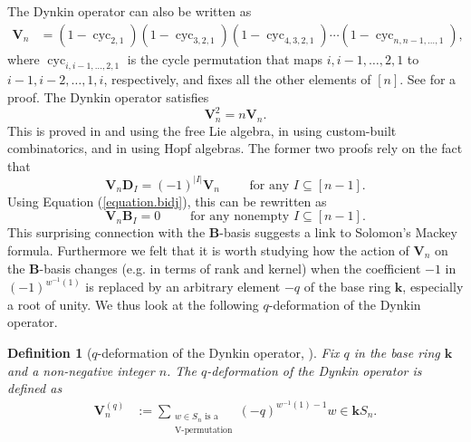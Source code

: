 \documentclass[revision]{FPSAC2025}
\newtheorem{defn}{Definition}
\newcommand{\kk}{\mathbf{k}} %
\begin{document}
\noindent
The Dynkin operator can also be written as
\begin{align}
\label{eq.Vn=cycs}
\mathbf{V}_{n}
&  =\left(  1-\operatorname*{cyc}\nolimits_{2,1}\right)  \left(
1-\operatorname*{cyc}\nolimits_{3,2,1}\right)  \left(  1-\operatorname*{cyc}%
\nolimits_{4,3,2,1}\right)  \cdots\left(  1-\operatorname*{cyc}%
\nolimits_{n,n-1,\ldots,1}\right),
\end{align}
where $\operatorname*{cyc}\nolimits_{i,i-1,\dots,2,1}$ is the cycle permutation that maps $i,i-1,\ldots,2,1$ to $i-1,i-2,\ldots,1,i$, respectively, and fixes all the other elements of $[n]$.
See \cite[Lemma 1.1]{Garsia1990} for a proof. The Dynkin operator satisfies
%
\begin{equation}
\label{equation.vn2vn}
\mathbf{V}_{n}^{2}=n\mathbf{V}_{n}.
 \end{equation}
This is proved in \cite[\S 1]{BergeronBergeronGarsia} and \cite[Remark 2.1]{Garsia1990} using the free Lie algebra, in \cite[proof of (5)]{BleLau92} using custom-built combinatorics, and in \cite[Subsection 4.5.2]{sga} using Hopf algebras.
The former two proofs rely on the fact that
\begin{equation}
\label{equation.vndi}
\mathbf{V}_{n}\mathbf{D}_{I}=\left(  -1\right)  ^{\left\vert I\right\vert}\mathbf{V}_{n}
\qquad \text{ for any } I \subseteq \left[n-1\right].
\end{equation}
Using Equation (\ref{equation.bidj}), this can be rewritten as
%
\begin{equation}
\label{equation.vnbi}
\mathbf{V}_{n}\mathbf{B}_{I}=0
\qquad \text{ for any nonempty } I \subseteq \left[n-1\right].
\end{equation}
This surprising connection with the $\mathbf{B}$-basis
suggests a link to Solomon's Mackey formula.
Furthermore we felt that it is worth studying how the action of  $\mathbf{V}_{n}$ on the $\mathbf{B}$-basis changes (e.g. in terms of rank and kernel) when the coefficient $-1$ in $(-1)^{w^{-1}\left(  1\right)}$ is replaced by an arbitrary element $-q$ of the base ring $\mathbf{k}$, especially a root of unity. We thus look at the following $q$-deformation of the Dynkin operator. 
\begin{defn}[$q$-deformation of the Dynkin operator, \cite{CalderbankHanlonSundaram94}]
Fix $q$ in the base ring $\mathbf{k}$ and a non-negative integer $n$. The $q$-\emph{deformation} of the Dynkin operator is defined as
\begin{align}
\label{equation.vnq}
\mathbf{V}_{n}^{(q)}  &  :=\sum_{\substack{w\in S_{n}\text{ is
a}\\\text{V-permutation}}}(-q)^{w^{-1}\left(  1\right)  -1}w \in \kk S_n.
\end{align}
\end{defn}
\end{document}
